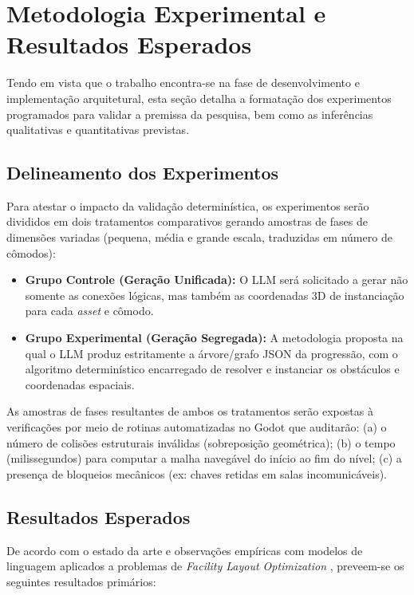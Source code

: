 \documentclass[
  12pt,
  a4paper,
  oneside,
  article,
  brazil
]{abntex2}
\begin{document}
\section{Metodologia Experimental e Resultados Esperados}

Tendo em vista que o trabalho encontra-se na fase de desenvolvimento e implementação arquitetural, esta seção detalha a formatação dos experimentos programados para validar a premissa da pesquisa, bem como as inferências qualitativas e quantitativas previstas.

\subsection{Delineamento dos Experimentos}

Para atestar o impacto da validação determinística, os experimentos serão divididos em dois tratamentos comparativos gerando amostras de fases de dimensões variadas (pequena, média e grande escala, traduzidas em número de cômodos):

\begin{itemize}[leftmargin=*]
  \item \textbf{Grupo Controle (Geração Unificada):} O LLM será solicitado a gerar não somente as conexões lógicas, mas também as coordenadas 3D de instanciação para cada \textit{asset} e cômodo.
  \item \textbf{Grupo Experimental (Geração Segregada):} A metodologia proposta na qual o LLM produz estritamente a árvore/grafo JSON da progressão, com o algoritmo determinístico encarregado de resolver e instanciar os obstáculos e coordenadas espaciais.
\end{itemize}

As amostras de fases resultantes de ambos os tratamentos serão expostas à verificações por meio de rotinas automatizadas no Godot que auditarão: (a) o número de colisões estruturais inválidas (sobreposição geométrica); (b) o tempo (milissegundos) para computar a malha navegável do início ao fim do nível; (c) a presença de bloqueios mecânicos (ex: chaves retidas em salas incomunicáveis).

\subsection{Resultados Esperados}

De acordo com o estado da arte e observações empíricas com modelos de linguagem aplicados a problemas de \textit{Facility Layout Optimization} \cite{xu2025constraint}, preveem-se os seguintes resultados primários:
\end{document}
